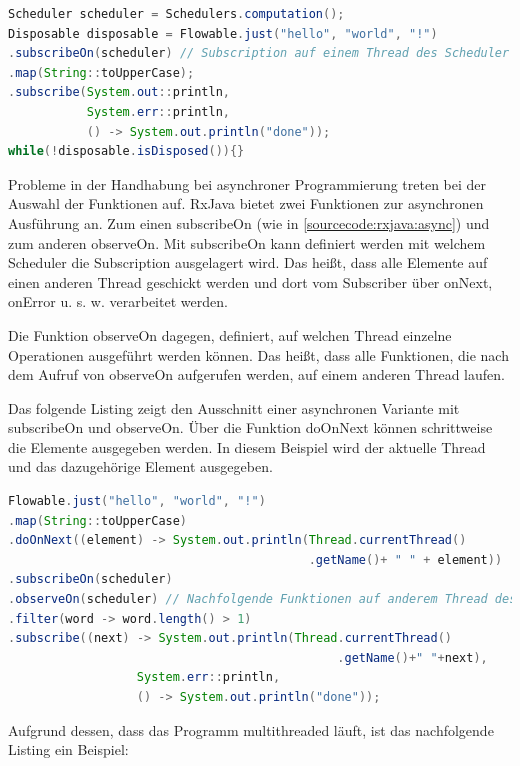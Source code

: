 \begin{lstlisting}[language=java,  label={sourcecode:rxjava:async}, captionpos=t, caption={Asynchron: RxJava Hello World (asynchron)}]
Scheduler scheduler = Schedulers.computation();
Disposable disposable = Flowable.just("hello", "world", "!")
.subscribeOn(scheduler) // Subscription auf einem Thread des Scheduler
.map(String::toUpperCase);
.subscribe(System.out::println,
     	   System.err::println,
           () -> System.out.println("done"));
while(!disposable.isDisposed()){}
\end{lstlisting}

Probleme in der Handhabung bei asynchroner Programmierung treten bei der Auswahl der Funktionen auf. RxJava bietet zwei Funktionen zur asynchronen Ausführung an. Zum einen subscribeOn (wie in \autoref{sourcecode:rxjava:async}) und zum anderen observeOn. Mit subscribeOn kann definiert werden mit welchem Scheduler die Subscription ausgelagert wird. Das heißt, dass alle Elemente auf einen anderen Thread geschickt werden und dort vom Subscriber über onNext, onError u. s. w. verarbeitet werden.

Die Funktion observeOn dagegen, definiert, auf welchen Thread einzelne Operationen ausgeführt werden können. Das heißt, dass alle Funktionen, die nach dem Aufruf von observeOn aufgerufen werden, auf einem anderen Thread laufen.

Das folgende Listing zeigt den Ausschnitt einer asynchronen Variante mit subscribeOn und observeOn. Über die Funktion doOnNext können schrittweise die Elemente ausgegeben werden. In diesem Beispiel wird der aktuelle Thread und das dazugehörige Element ausgegeben.
\clearpage
\begin{lstlisting}[language=java,  label={sourcecode:rxjava:async:debug}, captionpos=t, caption={RxJava Hello World debug}]
Flowable.just("hello", "world", "!")
.map(String::toUpperCase)
.doOnNext((element) -> System.out.println(Thread.currentThread()
										  .getName()+ " " + element))
.subscribeOn(scheduler)
.observeOn(scheduler) // Nachfolgende Funktionen auf anderem Thread des Schedulers
.filter(word -> word.length() > 1)
.subscribe((next) -> System.out.println(Thread.currentThread()
										      .getName()+" "+next),
                  System.err::println,
	              () -> System.out.println("done"));
\end{lstlisting}

Aufgrund dessen, dass das Programm multithreaded läuft, ist das nachfolgende Listing ein Beispiel:

